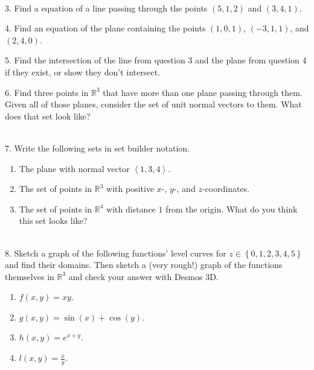 \documentclass{article}
\begin{document}
~\\

3. Find a equation of a line passing through the points $(5, 1, 2)$ and $(3, 4, 1)$.

4. Find an equation of the plane containing the points $(1, 0, 1)$, $(-3, 1, 1)$, and $(2, 4, 0)$.

5. Find the intersection of the line from question 3 and the plane from question 4 if they exist, or show they don't intersect.

6. Find three points in $\mathbb{R}^3$ that have more than one plane passing through them. Given all of those planes, consider the set of unit normal vectors to them. What does that set look like?

~\\

7. Write the following sets in set builder notation.

\begin{enumerate}

	\item The plane with normal vector $\left< 1, 3, 4 \right>$.

	\item The set of points in $\mathbb{R}^3$ with positive $x$-, $y$-, and $z$-coordinates.

	\item The set of points in $\mathbb{R}^4$ with distance $1$ from the origin. What do you think this set looks like?

\end{enumerate}

~\\

8. Sketch a graph of the following functions' level curves for $z \in \left\{ 0, 1, 2, 3, 4, 5 \right\}$ and find their domains. Then sketch a (very rough!) graph of the functions themselves in $\mathbb{R}^3$ and check your answer with Desmos 3D.

\begin{enumerate}

	\item $f(x, y) = xy$.

	\item $g(x, y) = \sin(x) + \cos(y)$.

	\item $h(x, y) = e^{x + y}$.

	\item $l(x, y) = \frac{x}{y}$.

\end{enumerate}
\end{document}
